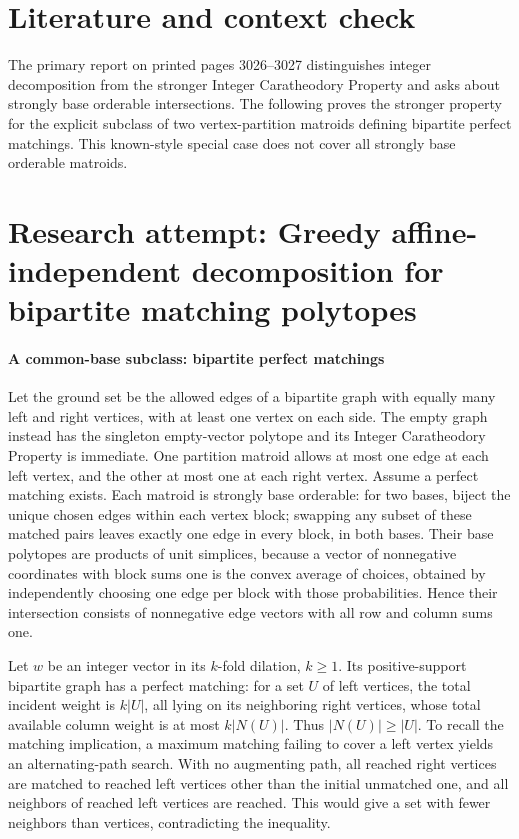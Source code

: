 \documentclass[11pt]{article}
\begin{document}
\section{Literature and context check}
The primary report on printed pages 3026--3027 distinguishes integer decomposition from the stronger Integer Caratheodory Property and asks about strongly base orderable intersections. The following proves the stronger property for the explicit subclass of two vertex-partition matroids defining bipartite perfect matchings. This known-style special case does not cover all strongly base orderable matroids.
\section{Research attempt: Greedy affine-independent decomposition for bipartite matching polytopes}

\paragraph{A common-base subclass: bipartite perfect matchings}
Let the ground set be the allowed edges of a bipartite graph with equally many left and right vertices, with at least one vertex on each side. The empty graph instead has the singleton empty-vector polytope and its Integer Caratheodory Property is immediate. One partition matroid allows at most one edge at each left vertex, and the other at most one at each right vertex. Assume a perfect matching exists. Each matroid is strongly base orderable: for two bases, biject the unique chosen edges within each vertex block; swapping any subset of these matched pairs leaves exactly one edge in every block, in both bases. Their base polytopes are products of unit simplices, because a vector of nonnegative coordinates with block sums one is the convex average of choices, obtained by independently choosing one edge per block with those probabilities. Hence their intersection consists of nonnegative edge vectors with all row and column sums one.

Let $w$ be an integer vector in its $k$-fold dilation, $k\geq1$. Its positive-support bipartite graph has a perfect matching: for a set $U$ of left vertices, the total incident weight is $k|U|$, all lying on its neighboring right vertices, whose total available column weight is at most $k|N(U)|$. Thus $|N(U)|\geq|U|$. To recall the matching implication, a maximum matching failing to cover a left vertex yields an alternating-path search. With no augmenting path, all reached right vertices are matched to reached left vertices other than the initial unmatched one, and all neighbors of reached left vertices are reached. This would give a set with fewer neighbors than vertices, contradicting the inequality.
\end{document}
